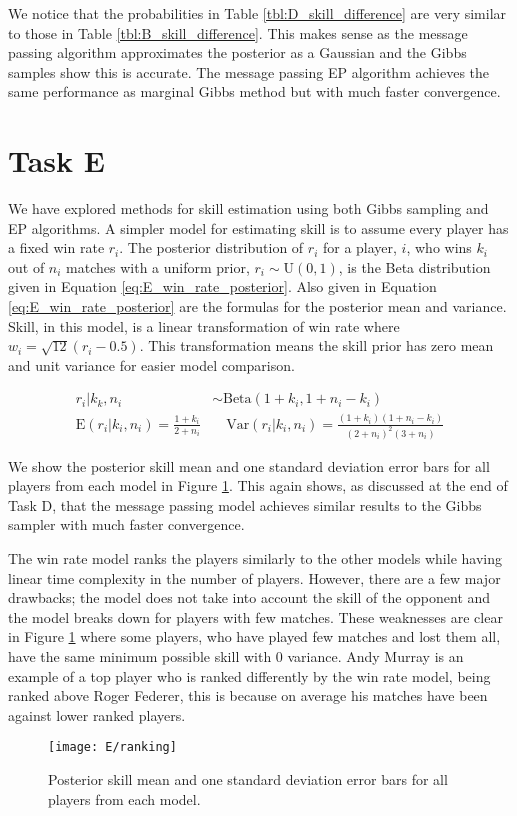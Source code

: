 \documentclass[11pt]{article}
\begin{document}
We notice that the probabilities in Table \ref{tbl:D_skill_difference} are very similar to those in Table \ref{tbl:B_skill_difference}. This makes sense as the message passing algorithm approximates the posterior as a Gaussian and the Gibbs samples show this is accurate. The message passing EP algorithm achieves the same performance as marginal Gibbs method but with much faster convergence.

\section{Task E}

We have explored methods for skill estimation using both Gibbs sampling and EP algorithms. A simpler model for estimating skill is to assume every player has a fixed win rate $r_i$. The posterior distribution of $r_i$ for a player, $i$, who wins $k_i$ out of $n_i$ matches with a uniform prior, $r_i \sim \text{U}(0,1)$, is the Beta distribution given in Equation \ref{eq:E_win_rate_posterior}. Also given in Equation \ref{eq:E_win_rate_posterior} are the formulas for the posterior mean and variance. Skill, in this model, is a linear transformation of win rate where $w_i = \sqrt{12}(r_i - 0.5)$. This transformation means the skill prior has zero mean and unit variance for easier model comparison.

\begin{equation}
    \begin{split}
        r_i|k_k,n_i &\sim \text{Beta}(1+k_i, 1+n_i-k_i) \\
        \text{E}(r_i|k_i,n_i) = \frac{1+k_i}{2+n_i} &\quad \text{Var}(r_i|k_i,n_i) = \frac{(1+k_i)(1+n_i-k_i)}{(2+n_i)^2(3+n_i)}
    \end{split}
    \label{eq:E_win_rate_posterior}
\end{equation}

We show the posterior skill mean and one standard deviation error bars for all players from each model in Figure \ref{fig:E_ranking}. This again shows, as discussed at the end of Task D, that the message passing model achieves similar results to the Gibbs sampler with much faster convergence. 

The win rate model ranks the players similarly to the other models while having linear time complexity in the number of players. However, there are a few major drawbacks; the model does not take into account the skill of the opponent and the model breaks down for players with few matches. These weaknesses are clear in Figure \ref{fig:E_ranking} where some players, who have played few matches and lost them all, have the same minimum possible skill with 0 variance. Andy Murray is an example of a top player who is ranked differently by the win rate model, being ranked above Roger Federer, this is because on average his matches have been against lower ranked players. 

\begin{figure}
    \centering
    \texttt{[image: E/ranking]}
    \caption{Posterior skill mean and one standard deviation error bars for all players from each model.}
    \label{fig:E_ranking}
\end{figure}
\end{document}
